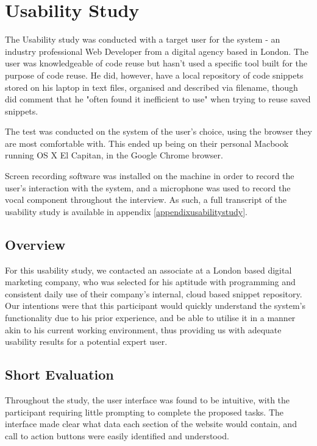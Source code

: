 \section{Usability Study} \label{usabilitystudy}

The Usability study was conducted with a target user for the system - an industry professional Web Developer from a digital agency based in London. 
The user was knowledgeable of code reuse but hasn't used a specific tool built for the purpose of code reuse. 
He did, however, have a local repository of code snippets stored on his laptop in text files, organised and described via filename, though did comment that he "often found it inefficient to use" when trying to reuse saved snippets.

The test was conducted on the system of the user's choice, using the browser they are most comfortable with. 
This ended up being on their personal Macbook running OS X El Capitan, in the Google Chrome browser.

Screen recording software was installed on the machine in order to record the user's interaction with the system, and a microphone was used to record the vocal component throughout the interview. As such, a full transcript of the usability study is available in appendix \ref{appendixusabilitystudy}.


\subsection{Overview}
For this usability study, we contacted an associate at a London based digital marketing company, who was selected for his aptitude with programming and consistent daily use of their company's internal, cloud based snippet repository.
Our intentions were that this participant would quickly understand the system's functionality due to his prior experience, and be able to utilise it in a manner akin to his current working environment, thus providing us with adequate usability results for a potential expert user.

\subsection{Short Evaluation}
Throughout the study, the user interface was found to be intuitive, with the participant requiring little prompting to complete the proposed tasks.
The interface made clear what data each section of the website would contain, and call to action buttons were easily identified and understood. 

